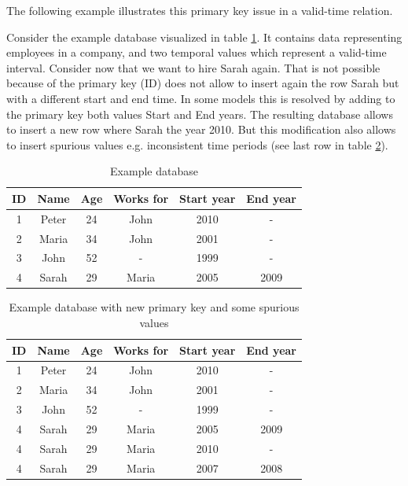 The following example illustrates this primary key issue in a valid-time relation.

\begin{example}
\label{ex:pk}
Consider the example database visualized in table \ref{table:example-database}. It contains data representing employees in a company, and two temporal values which represent a valid-time interval. Consider now that we want to hire Sarah again. That is not possible because of the primary key (ID) does not allow to insert again the row Sarah but with a different start and end time. In some models this is resolved by adding to the primary key both values Start and End years. The resulting database allows to insert a new row where Sarah the year 2010. But this modification also allows to insert spurious values e.g. inconsistent time periods (see last row in table \ref{table:example-database-with-new-pk}).



\begin{table}
\centering
\caption{Example database}
\begin{tabular}{c c c c c c }
\hline
\textbf{ID} & \textbf{Name} & \textbf{Age} & \textbf{Works for} & \textbf{Start year} & \textbf{End year} \\ \hline
1 & Peter & 24 & John &  2010 & - \\
2 & Maria & 34 & John & 2001 & - \\
3 & John & 52 & - &  1999 & - \\
4 & Sarah & 29 & Maria &  2005 & 2009 \\
\hline 
\end{tabular}
\label{table:example-database}



\end{table}




\begin{table}
\centering
\caption{Example database with new primary key and some spurious values}
\begin{tabular}{c c c c c c }
\hline
\textbf{ID} & \textbf{Name} & \textbf{Age} & \textbf{Works for} & \textbf{Start year} & \textbf{End year} \\ \hline
1 & Peter & 24 & John &  2010 & - \\
2 & Maria & 34 & John & 2001 & - \\
3 & John & 52 & - &  1999 & - \\
4 & Sarah & 29 & Maria &  2005 & 2009 \\
4 & Sarah & 29 & Maria &  2010 & - \\
4 & Sarah & 29 & Maria &  2007 & 2008 \\
\hline 
\end{tabular}
\label{table:example-database-with-new-pk}


\end{table}
\end{example}

